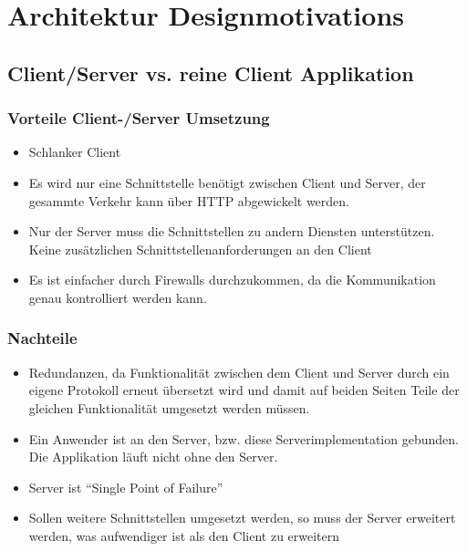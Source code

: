 \section{Architektur Designmotivations}
	\subsection{Client/Server vs. reine Client Applikation}
		\subsubsection{Vorteile Client-/Server Umsetzung}
		\begin{itemize}
			\item Schlanker Client
			\item Es wird nur eine Schnittstelle benötigt zwischen Client und Server, der gesammte Verkehr kann über HTTP abgewickelt werden.
			\item Nur der Server muss die Schnittstellen zu andern Diensten unterstützen. Keine zusätzlichen Schnittstellenanforderungen an den Client
			\item Es ist einfacher durch Firewalls durchzukommen, da die Kommunikation genau kontrolliert werden kann.
		\end{itemize}
		\subsubsection{Nachteile}
		\begin{itemize}
			\item Redundanzen, da Funktionalität zwischen dem Client und Server durch ein eigene Protokoll erneut übersetzt wird und damit auf beiden Seiten Teile der gleichen Funktionalität umgesetzt werden müssen.
			\item Ein Anwender ist an den Server, bzw. diese Serverimplementation gebunden. Die Applikation läuft nicht ohne den Server.
			\item Server ist ``Single Point of Failure''
			\item Sollen weitere Schnittstellen umgesetzt werden, so muss der Server erweitert werden, was aufwendiger ist als den Client zu erweitern
		\end{itemize}


